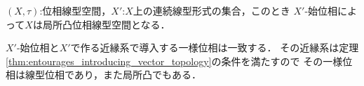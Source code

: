 	\begin{screen}
		\begin{thm}
		\end{thm}
	\end{screen}
	
	\begin{screen}
		\begin{thm}[弱位相は局所凸線型位相]
			$(X,\tau)$:位相線型空間，$X'$:$X$上の連続線型形式の集合，このとき
			$X'$-始位相によって$X$は局所凸位相線型空間となる．
		\end{thm}
	\end{screen}
	
	\begin{sketch}
		$X'$-始位相と$X'$で作る近縁系で導入する一様位相は一致する．
		その近縁系は定理\ref{thm:entourages_introducing_vector_topology}の条件を満たすので
		その一様位相は線型位相であり，また局所凸でもある．
	\end{sketch}